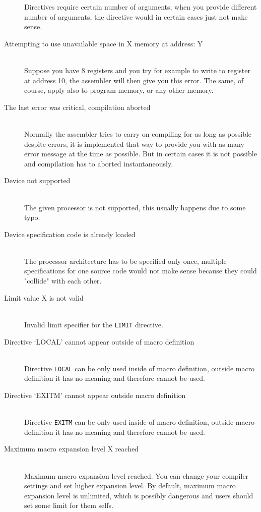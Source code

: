 \begin{description}
            Directives require certain number of arguments, when you provide different number of arguments, the directive would in certain cases just not make sense.
        \item[Attempting to use unavailable space in X memory at address: Y]~\\
            Suppose you have 8 registers and you try for example to write to register at address 10, the assembler will then give you this error. The same, of course, apply also to program memory, or any other memory.
        \item[The last error was critical, compilation aborted]~\\
            Normally the assembler tries to carry on compiling for as long as possible despite errors, it is implemented that way to provide you with as many error message at the time as possible. But in certain cases it is not possible and compilation has to aborted instantaneously.
        \item[Device not supported]~\\
            The given processor is not supported, this usually happens due to some typo.
        \item[Device specification code is already loaded ]~\\
            The processor architecture has to be specified only once, multiple specifications for one source code would not make sense because they could "collide" with each other.
        \item[Limit value X is not valid]~\\
            Invalid limit specifier for the \texttt{LIMIT} directive.
        \item[Directive `LOCAL' cannot appear outside of macro definition ]~\\
            Directive \texttt{LOCAL} can be only used inside of macro definition, outside macro definition it has no meaning and therefore cannot be used.
        \item[Directive `EXITM' cannot appear outside macro definition]~\\
            Directive \texttt{EXITM} can be only used inside of macro definition, outside macro definition it has no meaning and therefore cannot be used.
        \item[Maximum macro expansion level X reached]~\\
            Maximum macro expansion level reached. You can change your compiler settings and set higher expansion level. By default, maximum macro expansion level is unlimited, which is possibly dangerous and users should set some limit for them selfs.

\end{description}
